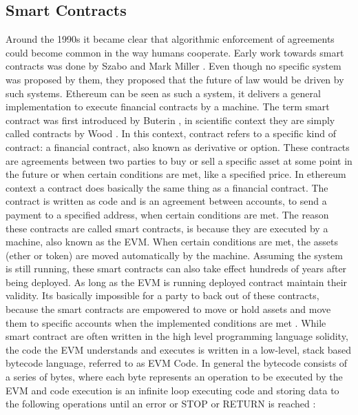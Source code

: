 \subsection{Smart Contracts}
\label{subsec:background:first_section:first_subsection}
Around the 1990s it became clear that algorithmic enforcement of agreements could become common in the way humans cooperate. Early work towards smart contracts was done by Szabo \cite{szabo1997formalizing} and Mark Miller \cite{miller1997future}. Even though no specific system was proposed by them, they proposed that the future of law would be driven by such systems. Ethereum can be seen as such a system, it delivers a general implementation to execute financial contracts by a machine. The term smart contract was first introduced by Buterin \cite{buterin2013ethereum}, in scientific context they are simply called contracts by Wood \cite{wood2014ethereum}. In this context, contract refers to a specific kind of contract: a financial contract, also known as derivative or option. These contracts are agreements between two parties to buy or sell a specific asset at some point in the future or when certain conditions are met, like a specified price. In ethereum context a contract does basically the same thing as a financial contract. The contract is written as code and is an agreement between accounts, to send a payment to a specified address, when certain conditions are met. The reason these contracts are called smart contracts, is because they are executed by a machine, also known as the \ac{EVM}. When certain conditions are met, the assets (ether or token) are moved automatically by the machine. Assuming the system is still running, these smart contracts can also take effect hundreds of years after being deployed. As long as the \ac{EVM} is running deployed contract maintain their validity. Its basically impossible for a party to back out of these contracts, because the smart contracts are empowered to move or hold assets and move them to specific accounts when the implemented conditions are met \cite{dannen2017introducing}. While smart contract are often written in the high level programming language solidity, the code the \ac{EVM} understands and executes is written in a low-level, stack based bytecode language, referred to as \ac{EVM Code}. In general the bytecode consists of a series of bytes, where each byte represents an operation to be executed by the \ac{EVM} and code execution is an infinite loop executing code and storing data to the following operations until an error or STOP or RETURN is reached \cite{buterin2013ethereum}:

